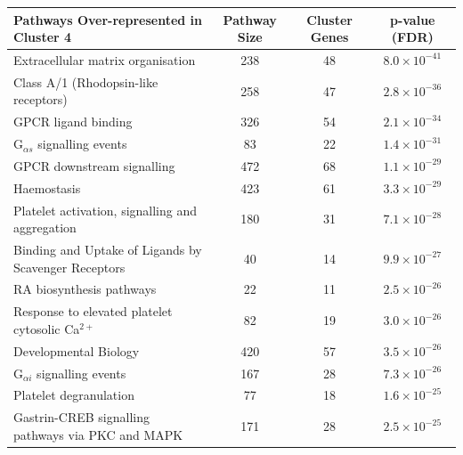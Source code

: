\begin{table}[!hp]
{\begin{threeparttable}
\begin{tabular}{lccc}
   \hline
  \cellcolor{white} \large{\textbf{Pathways Over-represented in Cluster 4}} & \large{\textbf{Pathway Size}} & \large{\textbf{Cluster Genes}} & \large{\textbf{p-value (\gls{FDR})}} \\ %
  \hline 
  \rowcolor{Cluster_Red!20}
  Extracellular matrix organisation & 238 &  48 & $8.0 \times 10^{-41}$ \\
  \rowcolor{Cluster_Red!15} 
  Class A/1 (Rhodopsin-like receptors) & 258 &  47 & $2.8 \times 10^{-36}$ \\
  \rowcolor{Cluster_Red!20} 
  GPCR ligand binding & 326 &  54 & $2.1 \times 10^{-34}$ \\
  \rowcolor{Cluster_Red!15} 
  G$_{\alpha s}$ signalling events &  83 &  22 & $1.4 \times 10^{-31}$ \\
  \rowcolor{Cluster_Red!20} 
  GPCR downstream signalling & 472 &  68 & $1.1 \times 10^{-29}$ \\
  \rowcolor{Cluster_Red!15} 
  Haemostasis & 423 &  61 & $3.3 \times 10^{-29}$ \\
  \rowcolor{Cluster_Red!20} 
  Platelet activation, signalling and aggregation & 180 &  31 & $7.1 \times 10^{-28}$ \\
  \rowcolor{Cluster_Red!15} 
  Binding and Uptake of Ligands by Scavenger Receptors &  40 &  14 & $9.9 \times 10^{-27}$ \\
  \rowcolor{Cluster_Red!20} 
  RA biosynthesis \glspl{pathway} &  22 &  11 & $2.5 \times 10^{-26}$ \\
  \rowcolor{Cluster_Red!15} 
  Response to elevated platelet cytosolic Ca$^{2+}$ &  82 &  19 & $3.0 \times 10^{-26}$ \\
  \rowcolor{Cluster_Red!20} 
  Developmental Biology & 420 &  57 & $3.5 \times 10^{-26}$ \\
  \rowcolor{Cluster_Red!15} 
  G$_{\alpha i}$ signalling events & 167 &  28 & $7.3 \times 10^{-26}$ \\
  \rowcolor{Cluster_Red!20} 
  Platelet degranulation &  77 &  18 & $1.6 \times 10^{-25}$ \\
  \rowcolor{Cluster_Red!15} 
  Gastrin-CREB signalling \glspl{pathway} via PKC and MAPK & 171 &  28 & $2.5 \times 10^{-25}$ \\

\end{tabular}
\end{threeparttable}}
\end{table}

